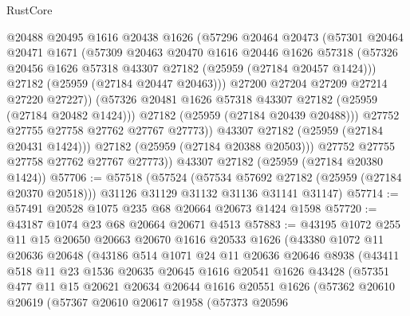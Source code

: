 \begin{lexlean}{RustCore}
\begin{coremodule}
                  @20488
                  @20495
                  @1616
                  @20438
                  @1626
                  (@57296
                    @20464
                    @20473
                    (@57301
                      @20464
                      @20471
                      @1671
                      (@57309
                        @20463
                        @20470
                        @1616
                        @20446
                        @1626
                        @57318
                        (@57326 @20456 @1626 @57318 @43307 @27182 (@25959 (@27184 @20457 @1424)))
                        @27182
                        (@25959 (@27184 @20447 @20463)))
                      @27200
                      @27204
                      @27209
                      @27214
                      @27220
                      @27227))
                  (@57326 @20481 @1626 @57318 @43307 @27182 (@25959 (@27184 @20482 @1424)))
                  @27182
                  (@25959 (@27184 @20439 @20488)))
                @27752
                @27755
                @27758
                @27762
                @27767
                @27773))
            @43307
            @27182
            (@25959 (@27184 @20431 @1424)))
          @27182
          (@25959 (@27184 @20388 @20503)))
        @27752
        @27755
        @27758
        @27762
        @27767
        @27773))
    @43307
    @27182
    (@25959 (@27184 @20380 @1424))
@57706 := @57518
    (@57524
      (@57534 @57692 @27182 (@25959 (@27184 @20370 @20518)))
      @31126
      @31129
      @31132
      @31136
      @31141
      @31147)
@57714 := @57491 @20528 @1075 @235 @68 @20664 @20673 @1424 @1598
@57720 := @43187 @1074 @23 @68 @20664 @20671 @4513
@57883 := @43195
    @1072
    @255
    @11
    @15
    @20650
    @20663
    @20670
    @1616
    @20533
    @1626
    (@43380
      @1072
      @11
      @20636
      @20648
      (@43186
        @514
        @1071
        @24
        @11
        @20636
        @20646
        @8938
        (@43411
          @518
          @11
          @23
          @1536
          @20635
          @20645
          @1616
          @20541
          @1626
          @43428
          (@57351
            @477
            @11
            @15
            @20621
            @20634
            @20644
            @1616
            @20551
            @1626
            (@57362
              @20610
              @20619
              (@57367
                @20610
                @20617
                @1958
                (@57373
                  @20596

\end{coremodule}
\end{lexlean}
